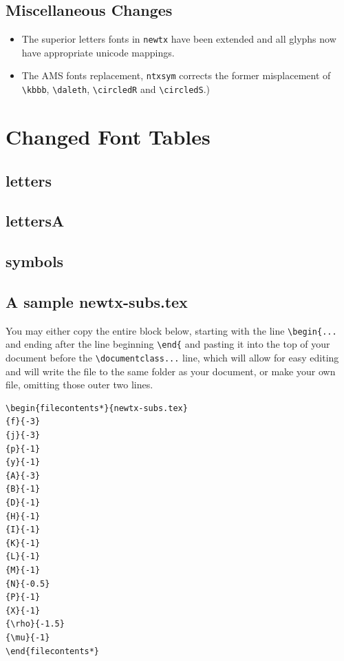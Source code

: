 \documentclass[\fsc]{article}
\theoremstyle{oldplain}
\theoremstyle{plain}
\begin{document}
\subsection{Miscellaneous Changes}
\begin{itemize}
\item
The superior letters fonts in {\tt newtx} 
have been extended and all glyphs now have appropriate unicode mappings.
\item
The AMS fonts replacement, {\tt ntxsym} corrects the former misplacement of \verb|\kbbb|, \verb|\daleth|, \verb|\circledR| and \verb|\circledS|.)
\end{itemize}
\section{Changed Font Tables}
\subsection{letters}
\newpage  
\subsection{lettersA}
\newpage  
\subsection{symbols}
\newpage 
 
\subsection{A sample newtx-subs.tex}
You may either copy the entire block below, starting with the line \verb|\begin{...| and ending after the line beginning \verb|\end{|
and pasting it into the top of your document before the \verb|\documentclass...| line, which will allow for easy editing and will write the file to the same folder as your document, or make your own file, omitting those outer two lines.

\begin{verbatim}
\begin{filecontents*}{newtx-subs.tex}
{f}{-3}
{j}{-3}
{p}{-1}
{y}{-1}
{A}{-3}
{B}{-1}
{D}{-1}
{H}{-1}
{I}{-1}
{K}{-1}
{L}{-1}
{M}{-1}
{N}{-0.5}
{P}{-1}
{X}{-1}
{\rho}{-1.5}
{\mu}{-1}
\end{filecontents*}
\end{verbatim}
\end{document}
